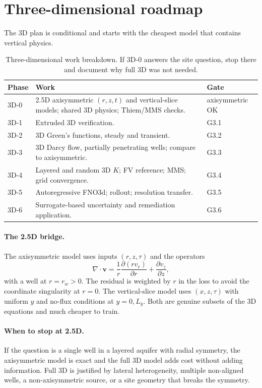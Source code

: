 \documentclass[11pt]{article}
\newcommand{\pdd}[2]{\frac{\partial #1}{\partial #2}}
\newcommand{\vv}{\mathbf{v}}
\newcommand{\tabhead}[1]{\textbf{#1}}
\begin{document}
\section{Three-dimensional roadmap}
\label{sec:3d}

The 3D plan is conditional and starts with the cheapest model that contains
vertical physics.

\begin{table}[htbp]
\centering
\small
\begin{tabularx}{\textwidth}{@{}lYl@{}}
\toprule
\tabhead{Phase} & \tabhead{Work} & \tabhead{Gate}\\
\midrule
3D-0 & 2.5D axisymmetric $(r,z,t)$ and vertical-slice models; shared 3D
       physics; Thiem/MMS checks. & axisymmetric OK\\
3D-1 & Extruded 3D verification. & G3.1\\
3D-2 & 3D Green's functions, steady and transient. & G3.2\\
3D-3 & 3D Darcy flow, partially penetrating wells; compare to axisymmetric. & G3.3\\
3D-4 & Layered and random 3D $K$; FV reference; MMS; grid convergence. & G3.4\\
3D-5 & Autoregressive FNO3d; rollout; resolution transfer. & G3.5\\
3D-6 & Surrogate-based uncertainty and remediation application. & G3.6\\
\bottomrule
\end{tabularx}
\caption{Three-dimensional work breakdown.  If 3D-0 answers the site question,
stop there and document why full 3D was not needed.}
\label{tab:3d}
\end{table}

\paragraph{The 2.5D bridge.}
The axisymmetric model uses inputs $(r,z,\tau)$ and the operators
\begin{equation}
\label{eq:rz}
\nabla\cdot\vv=\frac1r\pdd{(rv_r)}{r}+\pdd{v_z}{z},
\end{equation}
with a well at $r=r_w>0$.  The residual is weighted by $r$ in the loss to avoid
the coordinate singularity at $r=0$.  The vertical-slice model uses
$(x,z,\tau)$ with uniform $y$ and no-flux conditions at $y=0,L_y$.  Both are
genuine subsets of the 3D equations and much cheaper to train.

\paragraph{When to stop at 2.5D.}
If the question is a single well in a layered aquifer with radial symmetry,
the axisymmetric model is exact and the full 3D model adds cost without adding
information.  Full 3D is justified by lateral heterogeneity, multiple
non-aligned wells, a non-axisymmetric source, or a site geometry that breaks
the symmetry.
\end{document}
